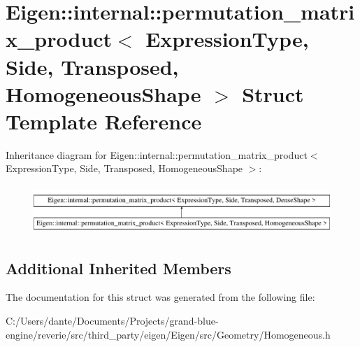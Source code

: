 \hypertarget{struct_eigen_1_1internal_1_1permutation__matrix__product_3_01_expression_type_00_01_side_00_01_t6e72df7be1755279b5abe7eabbb39875}{}\section{Eigen\+::internal\+::permutation\+\_\+matrix\+\_\+product$<$ Expression\+Type, Side, Transposed, Homogeneous\+Shape $>$ Struct Template Reference}
\label{struct_eigen_1_1internal_1_1permutation__matrix__product_3_01_expression_type_00_01_side_00_01_t6e72df7be1755279b5abe7eabbb39875}
Inheritance diagram for Eigen\+::internal\+::permutation\+\_\+matrix\+\_\+product$<$ Expression\+Type, Side, Transposed, Homogeneous\+Shape $>$\+:\begin{figure}[H]
\begin{center}
\leavevmode
\includegraphics[height=1.839080cm]{struct_eigen_1_1internal_1_1permutation__matrix__product_3_01_expression_type_00_01_side_00_01_t6e72df7be1755279b5abe7eabbb39875}
\end{center}
\end{figure}
\subsection*{Additional Inherited Members}


The documentation for this struct was generated from the following file\+:\begin{DoxyCompactItemize}
\item 
C\+:/\+Users/dante/\+Documents/\+Projects/grand-\/blue-\/engine/reverie/src/third\+\_\+party/eigen/\+Eigen/src/\+Geometry/Homogeneous.\+h\end{DoxyCompactItemize}
